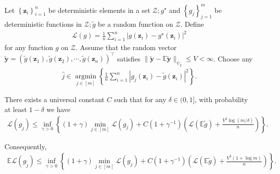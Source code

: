 \documentclass[12pt,a4paper,pdftex,onepage]{article}
\begin{document}
\begin{lemma}\label{lemma; loss model selection}
Let $\left\{\boldsymbol{z}_i\right\}_{i=1}^n$ be deterministic elements in a set $\mathcal{Z} ; g^{\star}$ and $\left\{g_j\right\}_{j=1}^m$ be deterministic functions in $\mathcal{Z} ; \widetilde{g}$ be a random function on $\mathcal{Z}$. Define
\begin{align*}
\mathcal{L}(g)=\frac{1}{n} \sum_{i=1}^n\left|g\left(\boldsymbol{z}_i\right)-g^{\star}\left(\boldsymbol{z}_i\right)\right|^2
\end{align*}
for any function $g$ on $\mathcal{Z}$. Assume that the random vector $\widetilde{\boldsymbol{y}}=\left(\widetilde{g}\left(\boldsymbol{z}_1\right), \widetilde{g}\left(\boldsymbol{z}_2\right), \cdots, \widetilde{g}\left(\boldsymbol{z}_n\right)\right)^{\top}$ satisfies $\|\widetilde{\boldsymbol{y}}-\mathbb{E} \widetilde{\boldsymbol{y}}\|_{\psi_2} \leq V<\infty$. Choose any
\begin{align*}
\widehat{j} \in \underset{j \in[m]}{\operatorname{argmin}}\left\{\frac{1}{n} \sum_{i=1}^n\left|g_j\left(\boldsymbol{z}_i\right)-\widetilde{g}\left(\boldsymbol{z}_i\right)\right|^2\right\} .
\end{align*}

There exists a universal constant $C$ such that for any $\delta \in(0,1]$, with probability at least $1-\delta$ we have
\begin{align*}
\mathcal{L}\left(g_{\tilde{j}}\right) \leq \inf _{\gamma>0}\left\{(1+\gamma) \min _{j \in[m]} \mathcal{L}\left(g_j\right)+C\left(1+\gamma^{-1}\right)\left(\mathcal{L}(\mathbb{E} \widetilde{g})+\frac{V^2 \log (m / \delta)}{n}\right)\right\} .
\end{align*}

Consequently,
\begin{align*}
\mathbb{E} \mathcal{L}\left(g_{\tilde{j}}\right) \leq \inf _{\gamma>0}\left\{(1+\gamma) \min _{j \in[m]} \mathcal{L}\left(g_j\right)+C\left(1+\gamma^{-1}\right)\left(\mathcal{L}(\mathbb{E} \widetilde{g})+\frac{V^2(1+\log m)}{n}\right)\right\}.
\end{align*}    
\end{lemma}
\end{document}

